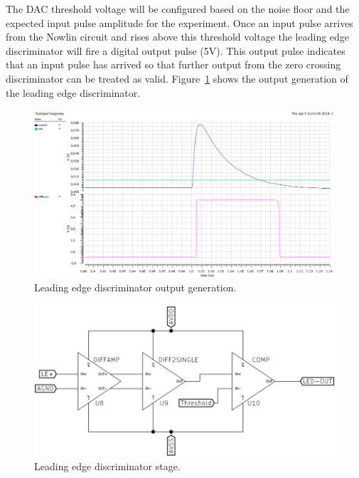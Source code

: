 \documentclass[12pt,oneside,final]{siuethesis}
\theoremstyle{definition}
\begin{document}
\par The DAC threshold voltage will be configured based on the noise floor and the expected input pulse amplitude for the experiment. Once an input pulse arrives from the Nowlin circuit and rises above this threshold voltage the leading edge discriminator will fire a digital  output pulse (5V). This output pulse indicates that an input pulse has arrived so that further output from the zero crossing discriminator can be treated as valid. Figure~\ref{fig:ledout} shows the output generation of the leading edge discriminator.
\begin{figure}[ht]
\centering
\includegraphics[scale=.4,keepaspectratio=true]{images/led_out.png} 
\caption{Leading edge discriminator output generation.}
\label{fig:ledout}
\end{figure}
\begin{figure}[ht]
\centering
\includegraphics[scale=.5,keepaspectratio=true]{images/led_circuit.png} 
\caption{Leading edge discriminator stage.}
\label{fig:LED}
\end{figure}
\end{document}
